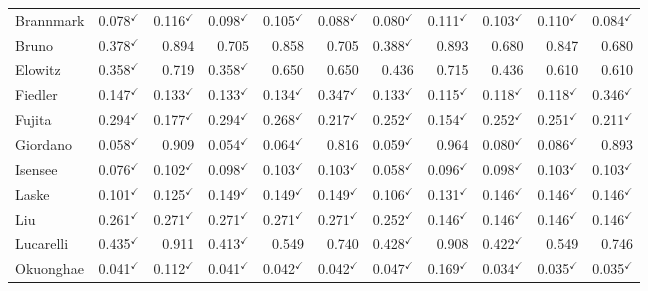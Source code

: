 \begin{longtable}{@{}lrrrrr|rrrrr@{}}
Brannmark & 0.078$^{\checkmark}$ & 0.116$^{\checkmark}$ & 0.098$^{\checkmark}$ & 0.105$^{\checkmark}$ & 0.088$^{\checkmark}$ & 0.080$^{\checkmark}$ & 0.111$^{\checkmark}$ & 0.103$^{\checkmark}$ & 0.110$^{\checkmark}$ & 0.084$^{\checkmark}$ \\
Bruno & 0.378$^{\checkmark}$ & 0.894 & 0.705 & 0.858 & 0.705 & 0.388$^{\checkmark}$ & 0.893 & 0.680 & 0.847 & 0.680 \\
Elowitz & 0.358$^{\checkmark}$ & 0.719 & 0.358$^{\checkmark}$ & 0.650 & 0.650 & 0.436 & 0.715 & 0.436 & 0.610 & 0.610 \\
Fiedler & 0.147$^{\checkmark}$ & 0.133$^{\checkmark}$ & 0.133$^{\checkmark}$ & 0.134$^{\checkmark}$ & 0.347$^{\checkmark}$ & 0.133$^{\checkmark}$ & 0.115$^{\checkmark}$ & 0.118$^{\checkmark}$ & 0.118$^{\checkmark}$ & 0.346$^{\checkmark}$ \\
Fujita & 0.294$^{\checkmark}$ & 0.177$^{\checkmark}$ & 0.294$^{\checkmark}$ & 0.268$^{\checkmark}$ & 0.217$^{\checkmark}$ & 0.252$^{\checkmark}$ & 0.154$^{\checkmark}$ & 0.252$^{\checkmark}$ & 0.251$^{\checkmark}$ & 0.211$^{\checkmark}$ \\
Giordano & 0.058$^{\checkmark}$ & 0.909 & 0.054$^{\checkmark}$ & 0.064$^{\checkmark}$ & 0.816 & 0.059$^{\checkmark}$ & 0.964 & 0.080$^{\checkmark}$ & 0.086$^{\checkmark}$ & 0.893 \\
Isensee & 0.076$^{\checkmark}$ & 0.102$^{\checkmark}$ & 0.098$^{\checkmark}$ & 0.103$^{\checkmark}$ & 0.103$^{\checkmark}$ & 0.058$^{\checkmark}$ & 0.096$^{\checkmark}$ & 0.098$^{\checkmark}$ & 0.103$^{\checkmark}$ & 0.103$^{\checkmark}$ \\
Laske & 0.101$^{\checkmark}$ & 0.125$^{\checkmark}$ & 0.149$^{\checkmark}$ & 0.149$^{\checkmark}$ & 0.149$^{\checkmark}$ & 0.106$^{\checkmark}$ & 0.131$^{\checkmark}$ & 0.146$^{\checkmark}$ & 0.146$^{\checkmark}$ & 0.146$^{\checkmark}$ \\
Liu & 0.261$^{\checkmark}$ & 0.271$^{\checkmark}$ & 0.271$^{\checkmark}$ & 0.271$^{\checkmark}$ & 0.271$^{\checkmark}$ & 0.252$^{\checkmark}$ & 0.146$^{\checkmark}$ & 0.146$^{\checkmark}$ & 0.146$^{\checkmark}$ & 0.146$^{\checkmark}$ \\
Lucarelli & 0.435$^{\checkmark}$ & 0.911 & 0.413$^{\checkmark}$ & 0.549 & 0.740 & 0.428$^{\checkmark}$ & 0.908 & 0.422$^{\checkmark}$ & 0.549 & 0.746 \\
Okuonghae & 0.041$^{\checkmark}$ & 0.112$^{\checkmark}$ & 0.041$^{\checkmark}$ & 0.042$^{\checkmark}$ & 0.042$^{\checkmark}$ & 0.047$^{\checkmark}$ & 0.169$^{\checkmark}$ & 0.034$^{\checkmark}$ & 0.035$^{\checkmark}$ & 0.035$^{\checkmark}$ \\

\end{longtable}
